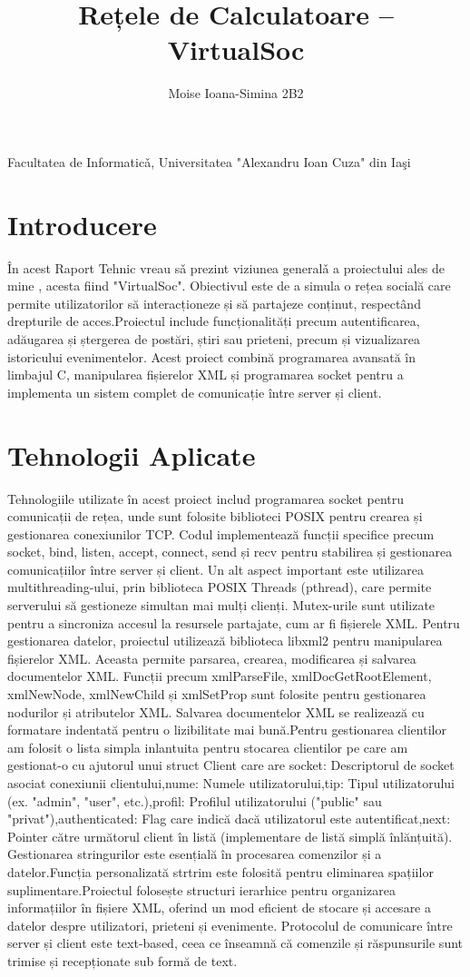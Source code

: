 \documentclass[12pt, a4paper]{article}
\title{Rețele de Calculatoare -- VirtualSoc}
\author{Moise Ioana-Simina 2B2}
\date{}
\begin{document}
\maketitle
\justifying
Facultatea de Informaticǎ, Universitatea "Alexandru Ioan Cuza" din Iaşi 

\section{Introducere}
În acest Raport Tehnic vreau sǎ prezint viziunea generalǎ a proiectului ales de mine , acesta fiind "VirtualSoc". Obiectivul este de a simula o rețea socială care permite utilizatorilor să interacționeze și să partajeze conținut, respectând drepturile de acces.Proiectul include funcționalități precum autentificarea, adăugarea și ștergerea de postări, știri sau prieteni, precum și vizualizarea istoricului evenimentelor.
Acest proiect combină programarea avansată în limbajul C, manipularea fișierelor XML și programarea socket pentru a implementa un sistem complet de comunicație între server și client.
\section{Tehnologii Aplicate}
Tehnologiile utilizate în acest proiect includ programarea socket pentru comunicații de rețea, unde sunt folosite biblioteci POSIX pentru crearea și gestionarea conexiunilor TCP. Codul implementează funcții specifice precum socket, bind, listen, accept, connect, send și recv pentru stabilirea și gestionarea comunicațiilor între server și client.
Un alt aspect important este utilizarea multithreading-ului, prin biblioteca POSIX Threads (pthread), care permite serverului să gestioneze simultan mai mulți clienți. Mutex-urile sunt utilizate pentru a sincroniza accesul la resursele partajate, cum ar fi fișierele XML.
Pentru gestionarea datelor, proiectul utilizează biblioteca libxml2 pentru manipularea fișierelor XML. Aceasta permite parsarea, crearea, modificarea și salvarea documentelor XML. Funcții precum xmlParseFile, xmlDocGetRootElement, xmlNewNode, xmlNewChild și xmlSetProp sunt folosite pentru gestionarea nodurilor și atributelor XML. Salvarea documentelor XML se realizează cu formatare indentată pentru o lizibilitate mai bună.Pentru gestionarea clientilor am folosit o lista simpla inlantuita pentru stocarea clientilor pe care am gestionat-o cu ajutorul unui struct Client care are socket: Descriptorul de socket asociat conexiunii clientului,nume: Numele utilizatorului,tip: Tipul utilizatorului (ex. "admin", "user", etc.),profil: Profilul utilizatorului ("public" sau "privat"),authenticated: Flag care indică dacă utilizatorul este autentificat,next: Pointer către următorul client în listă (implementare de listă simplă înlănțuită).
Gestionarea stringurilor este esențială în procesarea comenzilor și a datelor.Funcția personalizată strtrim este folosită pentru eliminarea spațiilor suplimentare.Proiectul folosește structuri ierarhice pentru organizarea informațiilor în fișiere XML, oferind un mod eficient de stocare și accesare a datelor despre utilizatori, prieteni și evenimente.
Protocolul de comunicare între server și client este text-based, ceea ce înseamnă că comenzile și răspunsurile sunt trimise și recepționate sub formă de text. 
\end{document}
